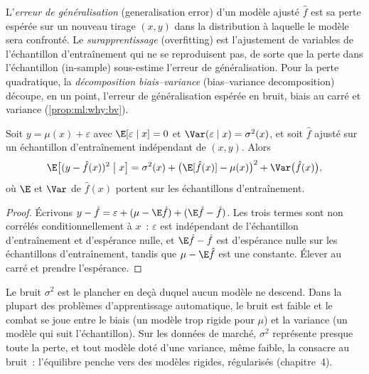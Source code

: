 \begin{definition}\label{def:ml:why-financial-machine-learning-is-different:generalisation}
L'\emph{erreur de généralisation} (generalisation error) d'un modèle ajusté $\hat f$ est sa perte espérée sur un nouveau
tirage $(x, y)$ dans la distribution à laquelle le modèle sera confronté. Le \emph{surapprentissage} (overfitting) est l'ajustement de
variables de l'échantillon d'entraînement qui ne se reproduisent pas, de sorte que la perte dans l'échantillon (in-sample) sous-estime l'erreur de généralisation.
Pour la perte quadratique, la \emph{décomposition biais--variance} (bias--variance decomposition) découpe, en un point, l'erreur de généralisation
espérée en bruit, biais au carré et variance (\cref{prop:ml:why:bv}).
\end{definition}

\begin{proposition}\label{prop:ml:why:bv}
Soit $y = \mu(x) + \varepsilon$ avec $\E[\varepsilon\mid x] = 0$ et $\Var(\varepsilon\mid x) = \sigma^2(x)$, et soit
$\hat f$ ajusté sur un échantillon d'entraînement indépendant de $(x, y)$. Alors
\[
\E\bigl[(y - \hat f(x))^2 \bigm| x\bigr] = \sigma^2(x) + \bigl(\E[\hat f(x)] - \mu(x)\bigr)^2 + \Var\bigl(\hat f(x)\bigr),
\]
où $\E$ et $\Var$ de $\hat f(x)$ portent sur les échantillons d'entraînement.
\end{proposition}

\begin{proof}
Écrivons $y - \hat f = \varepsilon + (\mu - \E\hat f) + (\E\hat f - \hat f)$. Les trois termes sont non corrélés conditionnellement à $x$~:
$\varepsilon$ est indépendant de l'échantillon d'entraînement et d'espérance nulle, et $\E\hat f - \hat f$ est d'espérance nulle sur
les échantillons d'entraînement, tandis que $\mu - \E\hat f$ est une constante. Élever au carré et prendre l'espérance.
\end{proof}

Le bruit $\sigma^2$ est le plancher en deçà duquel aucun modèle ne descend. Dans la plupart des problèmes d'apprentissage automatique, le bruit est faible et le combat se joue
entre le biais (un modèle trop rigide pour $\mu$) et la variance (un modèle qui suit l'échantillon). Sur les données de marché, $\sigma^2$ représente
presque toute la perte, et tout modèle doté d'une variance, même faible, la consacre au bruit~: l'équilibre penche vers des modèles rigides,
régularisés (chapitre~4).

